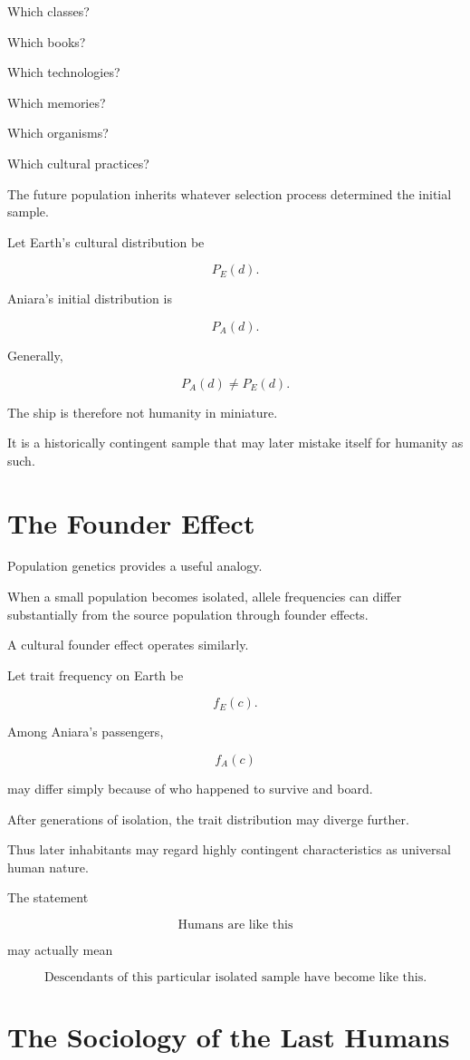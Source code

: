 \documentclass[11pt,oneside]{book}
\theoremstyle{definition}
\theoremstyle{remark}
\begin{document}
Which classes?

Which books?

Which technologies?

Which memories?

Which organisms?

Which cultural practices?

The future population inherits whatever selection process determined the initial sample.

Let Earth's cultural distribution be

\[
P_E(d).
\]

Aniara's initial distribution is

\[
P_A(d).
\]

Generally,

\[
P_A(d)\neq P_E(d).
\]

The ship is therefore not humanity in miniature.

It is a historically contingent sample that may later mistake itself for humanity as such.

\section{The Founder Effect}

Population genetics provides a useful analogy.

When a small population becomes isolated, allele frequencies can differ substantially from the source population through founder effects.

A cultural founder effect operates similarly.

Let trait frequency on Earth be

\[
f_E(c).
\]

Among Aniara's passengers,

\[
f_A(c)
\]

may differ simply because of who happened to survive and board.

After generations of isolation, the trait distribution may diverge further.

Thus later inhabitants may regard highly contingent characteristics as universal human nature.

The statement

\[
\text{Humans are like this}
\]

may actually mean

\[
\text{Descendants of this particular isolated sample have become like this}.
\]

\section{The Sociology of the Last Humans}
\end{document}
